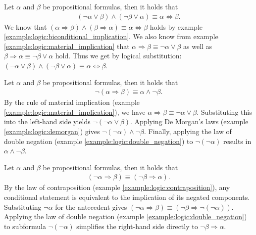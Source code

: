 \begin{examples}
    \begin{exampleenumerate}
        \item Let $\alpha$ and $\beta$ be propositional formulas, then it holds that
        \begin{align}(\lnot\alpha\lor \beta)\land (\lnot\beta\lor\alpha)\equiv \alpha\Leftrightarrow\beta.\end{align}
        We know that $(\alpha\Rightarrow\beta)\land(\beta\Rightarrow\alpha)\equiv\alpha\Leftrightarrow\beta$ holds by example \ref{example:logic:biconditional_implication}. We also know from example \ref{example:logic:material_implication} that $\alpha\Rightarrow\beta\equiv\lnot\alpha\lor\beta$ as well as $\beta\Rightarrow\alpha\equiv\lnot\beta\lor\alpha$ hold. Thus we get by logical substitution: $(\lnot\alpha\lor \beta)\land (\lnot\beta\lor\alpha)\equiv \alpha\Leftrightarrow\beta$.

        \item\label{example:logic:negated_implication} Let $\alpha$ and $\beta$ be propositional formulas, then it holds that
        \begin{align}\lnot(\alpha\Rightarrow\beta)\equiv \alpha\land\lnot\beta.\end{align}
        By the rule of material implication (example \ref{example:logic:material_implication}), we have $\alpha\Rightarrow\beta \equiv \lnot\alpha\lor\beta$. Substituting this into the left-hand side yields $\lnot(\lnot\alpha\lor\beta)$. Applying De Morgan's laws (example \ref{example:logic:demorgan}) gives $\lnot(\lnot\alpha)\land\lnot\beta$. Finally, applying the law of double negation (example \ref{example:logic:double_negation}) to $\lnot(\lnot\alpha)$ results in $\alpha\land\lnot\beta$.

        \item\label{example:logic:alternative_contraposition} Let $\alpha$ and $\beta$ be propositional formulas, then it holds that
        \begin{align}(\lnot\alpha\Rightarrow\beta)\equiv(\lnot\beta\Rightarrow\alpha).\end{align}
        By the law of contraposition (example \ref{example:logic:contraposition}), any conditional statement is equivalent to the implication of its negated components. Substituting $\lnot\alpha$ for the antecedent gives $(\lnot\alpha\Rightarrow\beta)\equiv(\lnot\beta\Rightarrow\lnot(\lnot\alpha))$. Applying the law of double negation (example \ref{example:logic:double_negation}) to subformula $\lnot(\lnot\alpha)$ simplifies the right-hand side directly to $\lnot\beta\Rightarrow\alpha$.


\end{exampleenumerate}
\end{examples}
